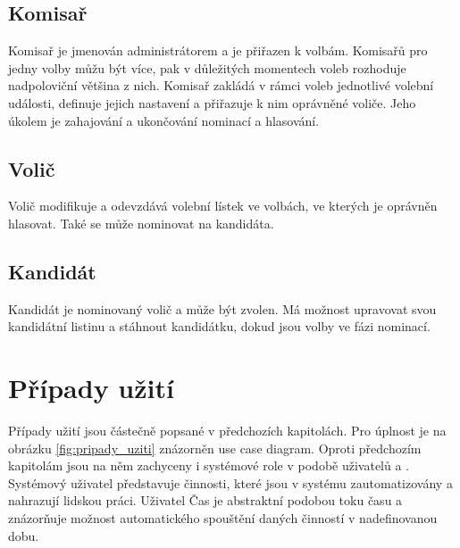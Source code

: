 \documentclass[11pt,twoside,a4paper]{book}
\begin{document}
\subsection{Komisař}

Komisař je jmenován administrátorem a je přiřazen k volbám. Komisařů pro jedny volby můžu být více, pak v důležitých momentech voleb rozhoduje nadpoloviční většina z nich. Komisař zakládá v rámci voleb jednotlivé volební události, definuje jejich nastavení a přiřazuje k nim oprávněné voliče. Jeho úkolem je zahajování a ukončování nominací a hlasování.

\subsection{Volič}

Volič modifikuje a odevzdává volební lístek ve volbách, ve kterých je oprávněn hlasovat. Také se může nominovat na kandidáta.


\subsection{Kandidát}

Kandidát je nominovaný volič a může být zvolen. Má možnost upravovat svou kandidátní listinu a stáhnout kandidátku, dokud jsou volby ve fázi nominací.

\section{Případy užití}

Případy užití jsou částečně popsané v předchozích kapitolách. Pro úplnost je na obrázku \ref{fig:pripady_uziti} znázorněn use case diagram. Oproti předchozím kapitolám jsou na něm zachyceny i systémové role v podobě uživatelů  a . Systémový uživatel představuje činnosti, které jsou v systému zautomatizovány a nahrazují lidskou práci. Uživatel Čas je abstraktní podobou toku času a znázorňuje možnost automatického spouštění daných činností v nadefinovanou dobu. 
\end{document}
